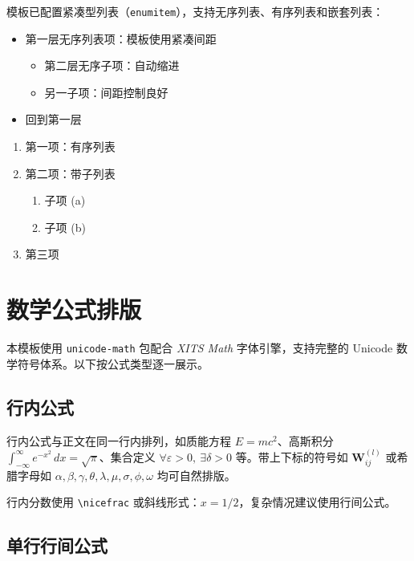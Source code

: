 \documentclass{harryopo-paper}
\begin{document}
模板已配置紧凑型列表（\verb|enumitem|），支持无序列表、有序列表和嵌套列表：

\begin{itemize}
    \item 第一层无序列表项：模板使用紧凑间距
    \begin{itemize}
        \item 第二层无序子项：自动缩进
        \item 另一子项：间距控制良好
    \end{itemize}
    \item 回到第一层
\end{itemize}

\begin{enumerate}
    \item 第一项：有序列表
    \item 第二项：带子列表
    \begin{enumerate}
        \item 子项 (a)
        \item 子项 (b)
    \end{enumerate}
    \item 第三项
\end{enumerate}

\section{数学公式排版}
\label{sec:math}

本模板使用 \texttt{unicode-math} 包配合 \emph{XITS Math} 字体引擎，支持完整的 Unicode 数学符号体系。以下按公式类型逐一展示。

\subsection{行内公式}

行内公式与正文在同一行内排列，如质能方程 $E = mc^{2}$、高斯积分 $\int_{-\infty}^{\infty} e^{-x^{2}}\,dx = \sqrt{\pi}$、集合定义 $\forall\varepsilon>0,\ \exists\delta>0$ 等。带上下标的符号如 $\mathbf{W}_{ij}^{(l)}$ 或希腊字母如 $\alpha, \beta, \gamma, \theta, \lambda, \mu, \sigma, \phi, \omega$ 均可自然排版。

行内分数使用 \verb|\nicefrac| 或斜线形式：$x = 1/2$，复杂情况建议使用行间公式。

\subsection{单行行间公式}
\end{document}
